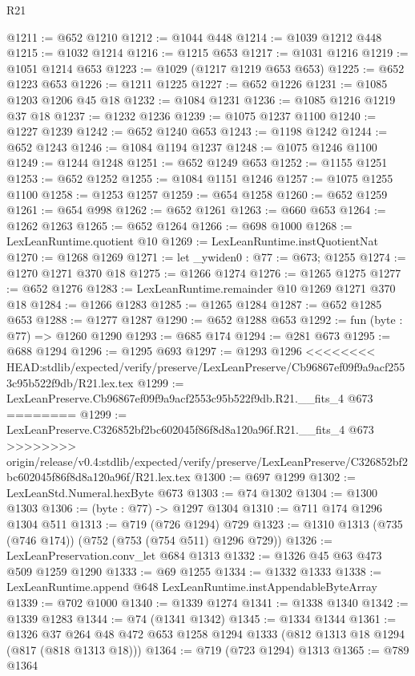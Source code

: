 \begin{lexlean}{R21}
\begin{coremodule}
{{{{{{{{{{{{{{{@1211 := @652 @1210
@1212 := @1044 @448
@1214 := @1039 @1212 @448
@1215 := @1032 @1214
@1216 := @1215 @653
@1217 := @1031 @1216
@1219 := @1051 @1214 @653
@1223 := @1029 (@1217 @1219 @653 @653)
@1225 := @652 @1223 @653
@1226 := @1211 @1225
@1227 := @652 @1226
@1231 := @1085 @1203 @1206 @45 @18
@1232 := @1084 @1231
@1236 := @1085 @1216 @1219 @37 @18
@1237 := @1232 @1236
@1239 := @1075 @1237 @1100
@1240 := @1227 @1239
@1242 := @652 @1240 @653
@1243 := @1198 @1242
@1244 := @652 @1243
@1246 := @1084 @1194 @1237
@1248 := @1075 @1246 @1100
@1249 := @1244 @1248
@1251 := @652 @1249 @653
@1252 := @1155 @1251
@1253 := @652 @1252
@1255 := @1084 @1151 @1246
@1257 := @1075 @1255 @1100
@1258 := @1253 @1257
@1259 := @654 @1258
@1260 := @652 @1259
@1261 := @654 @998
@1262 := @652 @1261
@1263 := @660 @653
@1264 := @1262 @1263
@1265 := @652 @1264
@1266 := @698 @1000
@1268 := LexLeanRuntime.quotient @10
@1269 := LexLeanRuntime.instQuotientNat
@1270 := @1268 @1269
@1271 := let _ywiden0 : @77 := @673; @1255
@1274 := @1270 @1271 @370 @18
@1275 := @1266 @1274
@1276 := @1265 @1275
@1277 := @652 @1276
@1283 := LexLeanRuntime.remainder @10 @1269 @1271 @370 @18
@1284 := @1266 @1283
@1285 := @1265 @1284
@1287 := @652 @1285 @653
@1288 := @1277 @1287
@1290 := @652 @1288 @653
@1292 := fun (byte : @77) => @1260 @1290
@1293 := @685 @174
@1294 := @281 @673
@1295 := @688 @1294
@1296 := @1295 @693
@1297 := @1293 @1296
<<<<<<<< HEAD:stdlib/expected/verify/preserve/LexLeanPreserve/Cb96867ef09f9a9acf2553c95b522f9db/R21.lex.tex
@1299 := LexLeanPreserve.Cb96867ef09f9a9acf2553c95b522f9db.R21.__fits_4 @673
========
@1299 := LexLeanPreserve.C326852bf2bc602045f86f8d8a120a96f.R21.__fits_4 @673
>>>>>>>> origin/release/v0.4:stdlib/expected/verify/preserve/LexLeanPreserve/C326852bf2bc602045f86f8d8a120a96f/R21.lex.tex
@1300 := @697 @1299
@1302 := LexLeanStd.Numeral.hexByte @673
@1303 := @74 @1302
@1304 := @1300 @1303
@1306 := (byte : @77) -> @1297 @1304
@1310 := @711 @174 @1296 @1304 @511
@1313 := @719 (@726 @1294) @729
@1323 := @1310 @1313 (@735 (@746 @174)) (@752 (@753 (@754 @511) @1296 @729))
@1326 := LexLeanPreservation.conv_let @684 @1313
@1332 := @1326 @45 @63 @473 @509 @1259 @1290
@1333 := @69 @1255
@1334 := @1332 @1333
@1338 := LexLeanRuntime.append @648 LexLeanRuntime.instAppendableByteArray
@1339 := @702 @1000
@1340 := @1339 @1274
@1341 := @1338 @1340
@1342 := @1339 @1283
@1344 := @74 (@1341 @1342)
@1345 := @1334 @1344
@1361 := @1326
    @37
    @264
    @48
    @472
    @653
    @1258
    @1294
    @1333
    (@812 @1313 @18 @1294 (@817 (@818 @1313 @18)))
@1364 := @719 (@723 @1294) @1313
@1365 := @789 @1364
}}}}}}}}}}}}}}}
\end{coremodule}
\end{lexlean}
